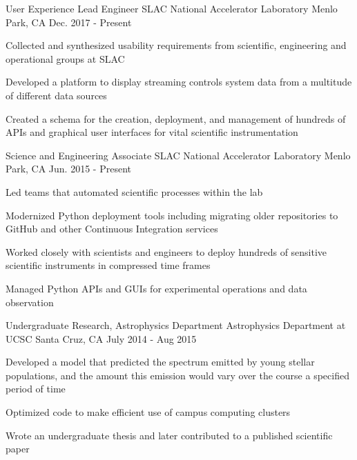 \begin{cventries}
  \cventry
    {User Experience Lead Engineer}
    {SLAC National Accelerator Laboratory}
    {Menlo Park, CA}
    {Dec. 2017 - Present}
    {
      \begin{cvitems}
        \item {Collected and synthesized usability requirements from scientific, engineering
               and operational groups at SLAC}
        \item {Developed a platform to display streaming controls system data
               from a multitude of different data sources}
        \item {Created a schema for the creation, deployment, and management of
               hundreds of APIs and graphical user interfaces for vital scientific
               instrumentation}
    \end{cvitems}
    }
  \cventry
    {Science and Engineering Associate}
    {SLAC National Accelerator Laboratory}
    {Menlo Park, CA}
    {Jun. 2015 - Present}
    {
      \begin{cvitems}
        \item {Led teams that automated scientific processes within the lab}
        \item {Modernized Python deployment tools including migrating older
               repositories to GitHub and other Continuous Integration
               services}
        \item {Worked closely with scientists and engineers to deploy hundreds
               of sensitive scientific instruments in compressed time frames}
        \item {Managed Python APIs and GUIs for experimental operations and
               data observation} 
    \end{cvitems}
    }
  \cventry
    {Undergraduate Research, Astrophysics Department}
    {Astrophysics Department at UCSC}
    {Santa Cruz, CA}
    {July 2014 - Aug 2015}
    {
      \begin{cvitems}
        \item {Developed a model that predicted the spectrum emitted by young
               stellar populations, and the amount this emission would vary
               over the course a specified period of time}
        \item {Optimized code to make efficient use of campus computing
               clusters}
        \item {Wrote an undergraduate thesis and later contributed to a
               published scientific paper}
      \end{cvitems}
      }
\end{cventries}
